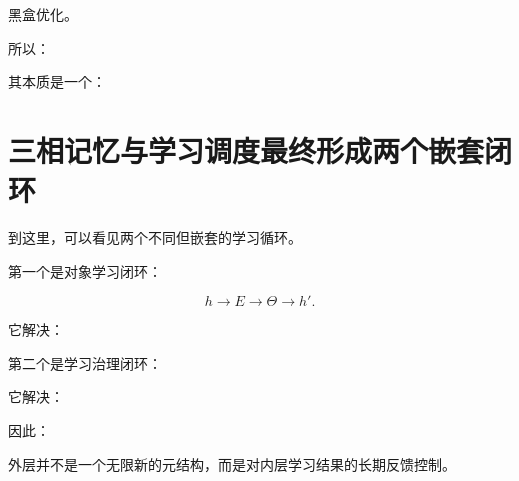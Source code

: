 黑盒优化。

所以：

\begin{statementbox}
\centering
{}
\end{statementbox}

其本质是一个：

\begin{statementbox}
\centering
{}
\end{statementbox}


\section{三相记忆与学习调度最终形成两个嵌套闭环}

到这里，可以看见两个不同但嵌套的学习循环。

第一个是对象学习闭环：

\[
\boxed{
h
\rightarrow
E
\rightarrow
\Theta
\rightarrow
h'.
}
\]

它解决：

\begin{statementbox}
\centering
{}
\end{statementbox}

第二个是学习治理闭环：

\begin{statementbox}
\centering
{}
\end{statementbox}

它解决：

\begin{statementbox}
\centering
{}
\end{statementbox}

因此：

\begin{statementbox}
\centering
{}
\end{statementbox}

外层并不是一个无限新的元结构，而是对内层学习结果的长期反馈控制。

